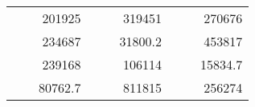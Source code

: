 \begin{table}[H]
\begin{tabular}{|ccrccrccc}
\rowcolor[HTML]{DAE8FC} 
\multicolumn{1}{|c|}{\cellcolor[HTML]{FFFFC7}}                                & \multicolumn{1}{c|}{\cellcolor[HTML]{DAE8FC}}                      & \multicolumn{1}{r|}{\cellcolor[HTML]{DAE8FC}201925}    & \multicolumn{1}{c|}{\cellcolor[HTML]{FFFFC7}}                                & \multicolumn{1}{c|}{\cellcolor[HTML]{DAE8FC}}                       & \multicolumn{1}{r|}{\cellcolor[HTML]{DAE8FC}319451}    & \multicolumn{1}{c|}{\cellcolor[HTML]{FFFFC7}}                                & \multicolumn{1}{c|}{\cellcolor[HTML]{DAE8FC}}                      & \multicolumn{1}{r|}{\cellcolor[HTML]{DAE8FC}270676}    \\ \cline{3-3} \cline{6-6} \cline{9-9} 
\multicolumn{1}{|c|}{\cellcolor[HTML]{FFFFC7}}                                & \multicolumn{1}{c|}{\cellcolor[HTML]{DAE8FC}}                      & \multicolumn{1}{r|}{\cellcolor[HTML]{DDFDFF}234687}    & \multicolumn{1}{c|}{\cellcolor[HTML]{FFFFC7}}                                & \multicolumn{1}{c|}{\cellcolor[HTML]{DAE8FC}}                       & \multicolumn{1}{r|}{\cellcolor[HTML]{DDFDFF}31800.2}   & \multicolumn{1}{c|}{\cellcolor[HTML]{FFFFC7}}                                & \multicolumn{1}{c|}{\cellcolor[HTML]{DAE8FC}}                      & \multicolumn{1}{r|}{\cellcolor[HTML]{DDFDFF}453817}    \\ \cline{3-3} \cline{6-6} \cline{9-9} 
\rowcolor[HTML]{DAE8FC} 
\multicolumn{1}{|c|}{\cellcolor[HTML]{FFFFC7}}                                & \multicolumn{1}{c|}{\cellcolor[HTML]{DAE8FC}}                      & \multicolumn{1}{r|}{\cellcolor[HTML]{DAE8FC}239168}    & \multicolumn{1}{c|}{\cellcolor[HTML]{FFFFC7}}                                & \multicolumn{1}{c|}{\cellcolor[HTML]{DAE8FC}}                       & \multicolumn{1}{r|}{\cellcolor[HTML]{DAE8FC}106114}    & \multicolumn{1}{c|}{\cellcolor[HTML]{FFFFC7}}                                & \multicolumn{1}{c|}{\cellcolor[HTML]{DAE8FC}}                      & \multicolumn{1}{r|}{\cellcolor[HTML]{DAE8FC}15834.7}   \\ \cline{3-3} \cline{6-6} \cline{9-9} 
\multicolumn{1}{|c|}{\cellcolor[HTML]{FFFFC7}}                                & \multicolumn{1}{c|}{\cellcolor[HTML]{DAE8FC}}                      & \multicolumn{1}{r|}{\cellcolor[HTML]{DDFDFF}80762.7}   & \multicolumn{1}{c|}{\cellcolor[HTML]{FFFFC7}}                                & \multicolumn{1}{c|}{\cellcolor[HTML]{DAE8FC}}                       & \multicolumn{1}{r|}{\cellcolor[HTML]{DDFDFF}811815}    & \multicolumn{1}{c|}{\cellcolor[HTML]{FFFFC7}}                                & \multicolumn{1}{c|}{\cellcolor[HTML]{DAE8FC}}                      & \multicolumn{1}{r|}{\cellcolor[HTML]{DDFDFF}256274}    \\ \cline{3-3} \cline{6-6} \cline{9-9} 

\end{tabular}
\end{table}

